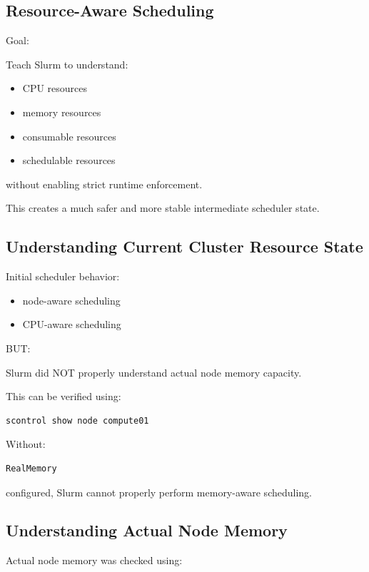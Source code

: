 \documentclass[11pt]{article}
\begin{document}
\subsection{Resource-Aware Scheduling}
\label{sec:orge88e5f1}

Goal:

Teach Slurm to understand:

\begin{itemize}
\item CPU resources
\item memory resources
\item consumable resources
\item schedulable resources
\end{itemize}

without enabling strict runtime enforcement.

This creates a much safer and more stable intermediate scheduler state.
\subsection{Understanding Current Cluster Resource State}
\label{sec:orgda7bdd5}

Initial scheduler behavior:

\begin{itemize}
\item node-aware scheduling
\item CPU-aware scheduling
\end{itemize}

BUT:

Slurm did NOT properly understand actual node memory capacity.

This can be verified using:

\begin{verbatim}
scontrol show node compute01
\end{verbatim}

Without:

\begin{verbatim}
RealMemory
\end{verbatim}

configured, Slurm cannot properly perform memory-aware scheduling.
\subsection{Understanding Actual Node Memory}
\label{sec:org5233b2a}

Actual node memory was checked using:
\end{document}
